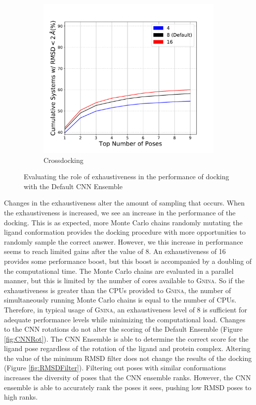 \documentclass[journal=jcisd8,manuscript=article]{achemso}
\begin{document}
\begin{figure}
\begin{subfigure}[b]{0.48\textwidth}
		\includegraphics[width=\textwidth]{figures/crossdocking/sweep_exhaustiveness_line.pdf}
		\caption{Crossdocking}
		\label{fig:exhaustiveness cd}
        \end{subfigure}    
	\caption{Evaluating the role of exhaustiveness in the performance of docking with the Default CNN Ensemble}
	\label{fig:exhaustiveness}
\end{figure}    

Changes in the exhaustiveness alter the amount of sampling that occurs. When the exhaustiveness is increased, we see an increase in the performance of the docking. This is as expected, more Monte Carlo chains randomly mutating the ligand conformation provides the docking procedure with more opportunities to randomly sample the correct answer. However, we this increase in performance seems to reach limited gains after the value of 8. An exhaustiveness of 16 provides some performance boost, but this boost is accompanied by a doubling of the computational time. The Monte Carlo chains are evaluated in a parallel manner, but this is limited by the number of cores available to \textsc{Gnina}. So if the exhaustiveness is greater than the CPUs provided to \textsc{Gnina}, the number of simultaneously running Monte Carlo chains is equal to the number of CPUs. Therefore, in typical usage of \textsc{Gnina}, an exhaustiveness level of 8 is sufficient for adequate performance levels while minimizing the computational load. Changes to the CNN rotations do not alter the scoring of the Default Ensemble (Figure \ref{fig:CNNRot}). The CNN Ensemble is able to determine the correct score for the ligand pose regardless of the rotation of the ligand and protein complex. Altering the value of the minimum RMSD filter does not change the results of the docking (Figure \ref{fig:RMSDFilter}).  Filtering out poses with similar conformations increases the diversity of poses that the CNN ensemble ranks. However, the CNN ensemble is able to accurately rank the poses it sees, pushing low RMSD poses to high ranks.
\end{document}

